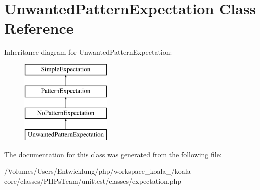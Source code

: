 \hypertarget{class_unwanted_pattern_expectation}{
\section{UnwantedPatternExpectation Class Reference}
\label{class_unwanted_pattern_expectation}
}
Inheritance diagram for UnwantedPatternExpectation:\begin{figure}[H]
\begin{center}
\leavevmode
\includegraphics[height=4.000000cm]{class_unwanted_pattern_expectation}
\end{center}
\end{figure}


The documentation for this class was generated from the following file:\begin{DoxyCompactItemize}
\item 
/Volumes/Users/Entwicklung/php/workspace\_\-koala\_/koala-\/core/classes/PHPsTeam/unittest/classes/expectation.php\end{DoxyCompactItemize}
